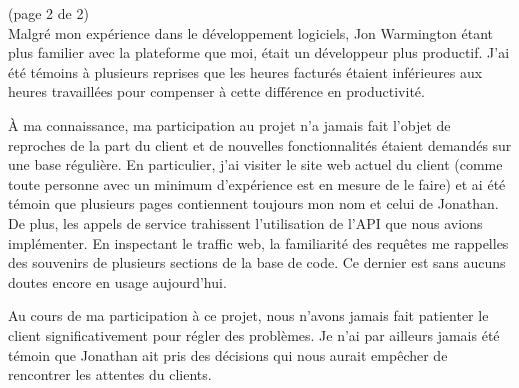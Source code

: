 \documentclass[executivepaper,leqno]{amsart}
\begin{document}


(page 2 de 2)\\
Malgr\'e mon exp\'erience dans le d\'eveloppement logiciels, Jon Warmington
\'etant plus familier avec la plateforme que moi, \'etait un d\'eveloppeur plus productif.
J'ai \'et\'e t\'emoins \`a plusieurs reprises que les heures factur\'es \'etaient
inf\'erieures aux heures travaill\'ees pour compenser \`a cette diff\'erence en
productivit\'e.

\`A ma connaissance, ma participation au projet n'a jamais fait l'objet de reproches de la
part du client et de nouvelles fonctionnalit\'es \'etaient demand\'es sur une base
r\'eguli\`ere. En particulier, j'ai visiter le site web actuel du client (comme toute
personne avec un minimum d'exp\'erience est en mesure de le faire) et ai \'et\'e t\'emoin
que plusieurs pages contiennent toujours mon nom et celui de Jonathan. De plus, les appels
de service trahissent l'utilisation de l'API que nous avions impl\'ementer. En inspectant
le traffic web, la familiarit\'e des requ\^etes me rappelles des souvenirs de plusieurs
sections de la base de code. Ce dernier est sans aucuns doutes encore en usage
aujourd'hui.

Au cours de ma participation \`a ce projet, nous n'avons jamais fait patienter le client
significativement pour r\'egler des probl\`emes. Je n'ai par ailleurs jamais \'et\'e
t\'emoin que Jonathan ait pris des d\'ecisions qui nous aurait emp\^echer de rencontrer
les attentes du clients.
\end{document}
